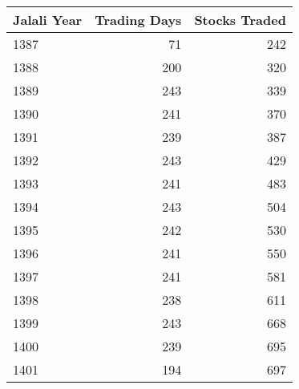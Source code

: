 \documentclass[border=0.2cm]{standalone}
\begin{document}
\begin{tabular}{lrr}

    \toprule
    Jalali Year & Trading Days & Stocks Traded \\
    \midrule
    1387        & 71           & 242           \\
    1388        & 200          & 320           \\
    1389        & 243          & 339           \\
    1390        & 241          & 370           \\
    1391        & 239          & 387           \\
    1392        & 243          & 429           \\
    1393        & 241          & 483           \\
    1394        & 243          & 504           \\
    1395        & 242          & 530           \\
    1396        & 241          & 550           \\
    1397        & 241          & 581           \\
    1398        & 238          & 611           \\
    1399        & 243          & 668           \\
    1400        & 239          & 695           \\
    1401        & 194          & 697           \\
    \bottomrule
\end{tabular}
\end{document}
